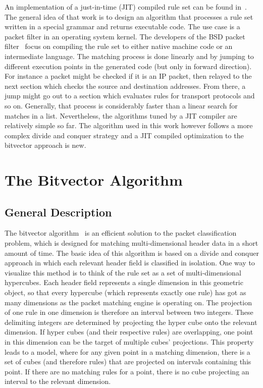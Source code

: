 \documentclass[a4paper,
		12pt,
		parskip=full,
		titlepage
		]{scrartcl}
\begin{document}
An implementation of a just-in-time (JIT) compiled rule set can be found in~\cite{dpf}.
The general idea of that work is to design an algorithm that processes a rule set
written in a special grammar and returns executable code.
The use case is a packet filter in an operating system kernel.
The developers of the BSD packet filter~\cite{bpf, bpfplus} focus on compiling the rule set to 
either native machine code or an intermediate language.
The matching process is done linearly and by jumping to different execution 
points in the generated code (but only in forward direction).
For instance a packet might be checked if it is an IP packet, then relayed 
to the next section which checks the source and destination addresses.
From there, a jump might go out to a section which evaluates rules for transport protocols and so on.
Generally, that process is considerably faster than a linear search for matches in a list.
Nevertheless, the algorithms tuned by a JIT compiler are relatively simple so far.
The algorithm used in this work however follows a more complex divide and conquer strategy and a JIT compiled optimization 
to the bitvector approach is new.

\section{The Bitvector Algorithm}
\subsection{General Description}
\label{sec:bv-general}
The bitvector algorithm~\cite{bv} is an efficient solution to the packet 
classification problem, which is designed for matching multi-dimensional header data in a short amount of time.
The basic idea of this algorithm is based on a divide and conquer approach in 
which each relevant header field is classified in isolation.
One way to visualize this method is to think of the rule set as a set of multi-dimensional hypercubes.
Each header field represents a single dimension in this geometric object, so 
that every hypercube (which represents exactly one rule) has got as many dimensions as the packet matching engine is operating on.
The projection of one rule in one dimension is therefore an interval between two integers.
These delimiting integers are determined by projecting the hyper cube onto the relevant dimension.
If hyper cubes (and their respective rules) are overlapping, one point in this dimension can be the target of multiple cubes' projections. 
This property leads to a model, where for any given point in a matching
dimension, there is a set of cubes (and therefore rules) that are projected on intervals containing this point.
If there are no matching rules for a point, there is no cube projecting an interval to the relevant dimension.
\end{document}
